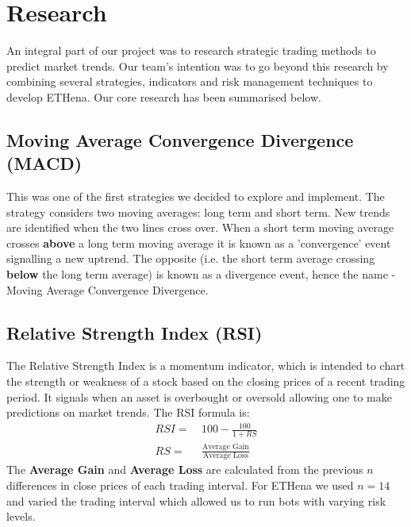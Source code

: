 \documentclass[12pt]{article}
\begin{document}
\begin{multicols}{2}
\begin{center}
{}
    \end{center}
    \section{Research}
    An integral part of our project was to research strategic trading methods to predict market trends. Our team's intention was to go beyond this research by combining several strategies, indicators and risk management techniques to develop ETHena. Our core research has been summarised below.

    \subsection{Moving Average Convergence Divergence (MACD)}
    This was one of the first strategies we decided to explore and implement. The strategy considers two moving averages: long term and short term. New trends are identified when the two lines cross over. When a short term moving average crosses \textbf{above} a long term moving average it is known as a 'convergence' event signalling a new uptrend. The opposite (i.e. the short term average crossing \textbf{below} the long term average) is known as a divergence event, hence the name - Moving Average Convergence Divergence.

    \subsection{Relative Strength Index (RSI)}
    The Relative Strength Index is a momentum indicator, which is intended to chart the strength or weakness of a stock based on the closing prices of a recent trading period. It signals when an asset is overbought or oversold allowing one to make predictions on market trends. The RSI formula is:
    \begin{align*}
        RSI = & \ 100 -\frac{100}{1+RS}                           \\
        RS =  & \ \frac{\text{Average Gain}}{\text{Average Loss}}
    \end{align*}
    The \textbf{Average Gain} and \textbf{Average Loss} are calculated from the previous $n$ differences in close prices of each trading interval. For ETHena we used $n=14$ and varied the trading interval which allowed us to run bots with varying risk levels.

\end{multicols}
\end{document}
